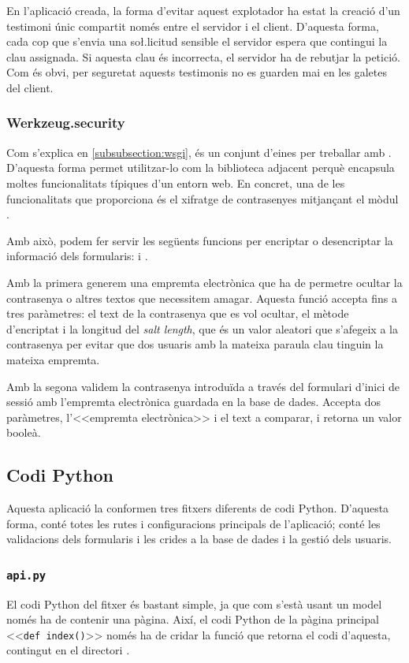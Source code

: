 \documentclass{tfgitic}[2022/06/30]
\begin{document}
En l'aplicació creada, la forma d'evitar aquest explotador ha estat la creació d'un testimoni únic compartit només entre el servidor i el client. D'aquesta forma, cada cop que s'envia una so\l.licitud sensible el servidor espera que contingui la clau  assignada. Si aquesta clau és incorrecta, el servidor ha de rebutjar la petició. Com és obvi, per seguretat aquests testimonis no es guarden mai en les galetes del client.

\subsubsection{Werkzeug.security}
Com s'explica en \ref{subsubsection:wsgi},  és un conjunt d'eines per treballar amb . D'aquesta forma permet utilitzar-lo com la biblioteca adjacent perquè encapsula moltes funcionalitats típiques d'un entorn web. En concret, una de les funcionalitats que proporciona és el xifratge de contrasenyes mitjançant el mòdul .

Amb això, podem fer servir les següents funcions per encriptar o desencriptar la informació dels formularis:  i .

Amb la primera generem una empremta electrònica que ha de permetre ocultar la contrasenya o altres textos que necessitem amagar. Aquesta funció accepta fins a tres paràmetres: el text de la contrasenya que es vol ocultar, el mètode d'encriptat i la longitud del \emph{salt length}, que és un valor aleatori que s'afegeix a la contrasenya per evitar que dos usuaris amb la mateixa paraula clau tinguin la mateixa empremta.

Amb la segona validem la contrasenya introduïda a través del formulari d'inici de sessió amb l'empremta electrònica guardada en la base de dades. Accepta dos paràmetres, l'<<empremta electrònica>> i el text a comparar, i retorna un valor booleà.

\subsection{Codi Python}
Aquesta aplicació la conformen tres fitxers diferents de codi Python. D'aquesta forma,  conté totes les rutes i configuracions principals de l'aplicació;  conté les validacions dels formularis i  les crides a la base de dades i la gestió dels usuaris.

\subsubsection{\texttt{api.py}}
\label{python:codiflask}
El codi Python del fitxer  és bastant simple, ja que com s'està usant un model  només ha de contenir una pàgina. Així, el codi Python de la pàgina principal <<\texttt{def index()}>> només ha de cridar la funció  que retorna el codi  d'aquesta, contingut en el directori .
\end{document}
